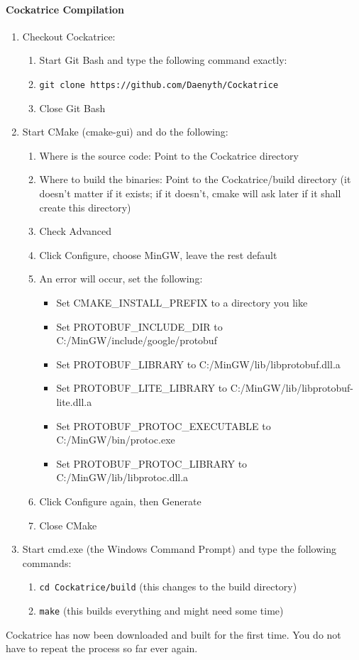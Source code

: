 \documentclass[a4paper]{scrbook}
\newcommand{\shellcmd}[1]{\texttt{\scriptsize #1}}
\begin{document}
\paragraph{Cockatrice Compilation}
\begin{enumerate}
 \item Checkout Cockatrice:
    \begin{enumerate}
     \item Start Git Bash and type the following command exactly:
     \item \shellcmd{git clone https://github.com/Daenyth/Cockatrice}
     \item Close Git Bash
    \end{enumerate}
 \item Start CMake (cmake-gui) and do the following:
    \begin{enumerate}
     \item Where is the source code: Point to the Cockatrice directory
     \item Where to build the binaries: Point to the Cockatrice/build directory (it doesn't matter if it exists; if it doesn't, cmake will ask later if it shall create this directory)
     \item Check Advanced
     \item Click Configure, choose MinGW, leave the rest default
     \item An error will occur, set the following:
     	\begin{itemize}
	 \item Set CMAKE\_INSTALL\_PREFIX to a directory you like
	 \item Set PROTOBUF\_INCLUDE\_DIR to C:/MinGW/include/google/protobuf
	 \item Set PROTOBUF\_LIBRARY to C:/MinGW/lib/libprotobuf.dll.a
	 \item Set PROTOBUF\_LITE\_LIBRARY to C:/MinGW/lib/libprotobuf-lite.dll.a
	 \item Set PROTOBUF\_PROTOC\_EXECUTABLE to C:/MinGW/bin/protoc.exe
	 \item Set PROTOBUF\_PROTOC\_LIBRARY to C:/MinGW/lib/libprotoc.dll.a
	\end{itemize}
     \item Click Configure again, then Generate
     \item Close CMake
    \end{enumerate}
 \item Start cmd.exe (the Windows Command Prompt) and type the following commands:
    \begin{enumerate}
     \item \shellcmd{cd Cockatrice/build} (this changes to the build directory)
     \item \shellcmd{make} (this builds everything and might need some time)
    \end{enumerate}
\end{enumerate}
Cockatrice has now been downloaded and built for the first time. You do not have to repeat the process so far ever again.
\end{document}
